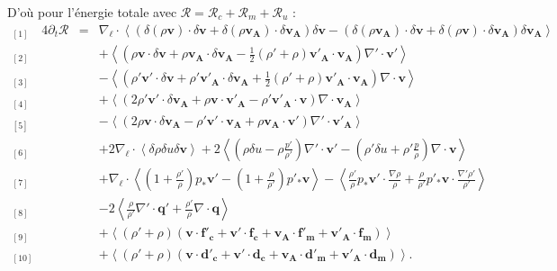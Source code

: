 D'où pour l'énergie totale avec $\mathcal{R} = \mathcal{R}_{c} + \mathcal{R}_{m} + \mathcal{R}_{u}$ :
\begin{equation}
\label{eq:turb_cpi_khm} \boxed{
\begin{array}{lcl}
{}_{[1]} \quad 4\partial_t \mathcal{R} &=& \nabla_{\boldsymbol{\ell}} \cdot \left<\left(\delta \left(\rho\boldsymbol{v}\right) \cdot \delta \boldsymbol{v}+ \delta \left(\rho\boldsymbol{v_A}\right) \cdot \delta \boldsymbol{v_A} \right)\delta \boldsymbol{v}  -\left(\delta \left(\rho\boldsymbol{v_A}\right) \cdot \delta \boldsymbol{v}  + \delta \left(\rho\boldsymbol{v}\right) \cdot \delta \boldsymbol{v_A}  \right) \delta \boldsymbol{v_A} \right>\\
{}_{[2]} && +\left< \left(\rho \boldsymbol{v} \cdot \delta \boldsymbol{v} +\rho \boldsymbol{v_A} \cdot \delta \boldsymbol{v_A} -\frac{1}{2} \left(\rho'+\rho\right) \boldsymbol{v'_A} \cdot \boldsymbol{v_A} \right) \nabla' \cdot \boldsymbol{v'} \right>\\
{}_{[3]} && -\left< \left(\rho' \boldsymbol{v'} \cdot \delta \boldsymbol{v} + \rho' \boldsymbol{v'_A} \cdot \delta \boldsymbol{v_A} + \frac{1}{2} \left(\rho'+\rho\right) \boldsymbol{v'_A} \cdot \boldsymbol{v_A}  \right)\nabla \cdot \boldsymbol{v}\right>\\
{}_{[4]} &&+ \left<\left(2 \rho' \boldsymbol{v'} \cdot \delta \boldsymbol{v_A}+\rho \boldsymbol{v} \cdot \boldsymbol{v'_A} - \rho' \boldsymbol{v'_A} \cdot \boldsymbol{v}  \right)\nabla \cdot \boldsymbol{v_A}\right> \\
{}_{[5]} &&- \left<\left(2\rho \boldsymbol{v} \cdot \delta \boldsymbol{v_A} -\rho' \boldsymbol{v'} \cdot \boldsymbol{v_A} +  \rho \boldsymbol{v_A} \cdot \boldsymbol{v'} \right)\nabla' \cdot \boldsymbol{v'_A}\right> \\
{}_{[6]} &&+ 2 \nabla_{\boldsymbol{\ell}} \cdot \left<\delta \rho  \delta u \delta \boldsymbol{v}\right> + 2\left<\left(\rho \delta u- \rho \frac{p'}{\rho'}\right)\nabla' \cdot \boldsymbol{v'}  - \left(\rho' \delta u + \rho' \frac{p}{\rho}\right) \nabla \cdot \boldsymbol{v} \right>\\
{}_{[7]} &&+  \nabla_{\boldsymbol{\ell}} \cdot \left< \left(1+\frac{\rho'}{\rho}\right)p_*  \boldsymbol{v'} -  \left(1+\frac{\rho}{\rho'}\right)p'_*  \boldsymbol{v} \right>- \left<\frac{\rho'}{\rho} p_*  \boldsymbol{v'} \cdot \frac{\nabla \rho}{\rho} + \frac{\rho}{\rho'} p'_*  \boldsymbol{v} \cdot \frac{\nabla' \rho'}{\rho'} \right>\\
{}_{[8]} &&-2\left<\frac{\rho}{\rho'}  \nabla' \cdot \boldsymbol{q'} + \frac{\rho'}{\rho}  \nabla \cdot \boldsymbol{q}  \right> \\
{}_{[9]}&&+  \left<\left(\rho' + \rho\right)\left(\boldsymbol{v} \cdot \boldsymbol{f'_c} + \boldsymbol{v'} \cdot \boldsymbol{f_c} + \boldsymbol{v_A} \cdot \boldsymbol{f'_m} + \boldsymbol{v'_A} \cdot \boldsymbol{f_m}\right) \right>\\
{}_{[10]}&&+ \left<\left(\rho' + \rho\right)\left(\boldsymbol{v} \cdot \boldsymbol{d'_c} + \boldsymbol{v'} \cdot \boldsymbol{d_c}+\boldsymbol{v_A} \cdot \boldsymbol{d'_m} + \boldsymbol{v'_A} \cdot \boldsymbol{d_m}\right)\right> .
\end{array}}
\end{equation} 
